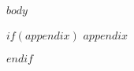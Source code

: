 \documentclass[
12pt, %
singlespacing, %
liststotoc, %
toctotoc, %
nohyperref, %
headsepline, %
]{MastersDoctoralThesis} %
\begin{document}

\mainmatter %

\pagestyle{thesis} %


$body$
%
%
%
%
%


$if(appendix)$
\appendix %
$appendix$

%
%
%
$endif$


\printbibliography[heading=bibintoc]

\end{document}
